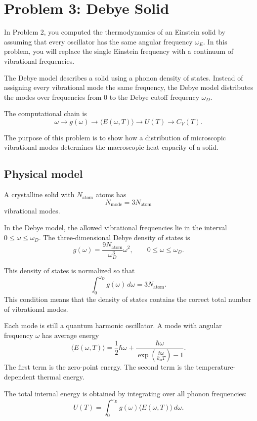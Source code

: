\section{Problem 3: Debye Solid}

In Problem 2, you computed the thermodynamics of an Einstein solid by assuming that every oscillator has the same angular frequency \(\omega_E\). In this problem, you will replace the single Einstein frequency with a continuum of vibrational frequencies.

The Debye model describes a solid using a phonon density of states. Instead of assigning every vibrational mode the same frequency, the Debye model distributes the modes over frequencies from \(0\) to the Debye cutoff frequency \(\omega_D\).

The computational chain is
\[
\omega
\longrightarrow
g(\omega)
\longrightarrow
\langle E(\omega,T)\rangle
\longrightarrow
U(T)
\longrightarrow
C_V(T).
\]

The purpose of this problem is to show how a distribution of microscopic vibrational modes determines the macroscopic heat capacity of a solid.

\subsection{Physical model}

A crystalline solid with \(N_{\mathrm{atom}}\) atoms has
\[
N_{\mathrm{mode}}=3N_{\mathrm{atom}}
\]
vibrational modes.

In the Debye model, the allowed vibrational frequencies lie in the interval \(0\le \omega\le\omega_D\). The three-dimensional Debye density of states is
\[
g(\omega)=\frac{9N_{\mathrm{atom}}}{\omega_D^3}\omega^2,
\qquad
0\le\omega\le\omega_D.
\]

This density of states is normalized so that
\[
\int_0^{\omega_D}g(\omega)\,d\omega=3N_{\mathrm{atom}}.
\]
This condition means that the density of states contains the correct total number of vibrational modes.

Each mode is still a quantum harmonic oscillator. A mode with angular frequency \(\omega\) has average energy
\[
\langle E(\omega,T)\rangle
=
\frac12\hbar\omega
+
\frac{\hbar\omega}{
\exp\left(\frac{\hbar\omega}{k_{\mathrm B}T}\right)-1
}.
\]
The first term is the zero-point energy. The second term is the temperature-dependent thermal energy.

The total internal energy is obtained by integrating over all phonon frequencies:
\[
U(T)=
\int_0^{\omega_D}
g(\omega)\langle E(\omega,T)\rangle\,d\omega.
\]

